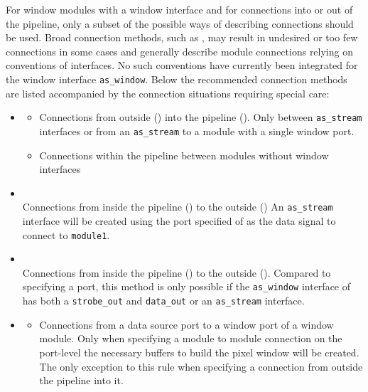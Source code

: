 For window modules with a window interface and for connections into or out of the pipeline, only a subset of the possible ways of describing connections should be used.
Broad connection methods, such as , may result in undesired or too few connections in some cases and generally describe module connections relying on conventions of interfaces.
No such conventions have currently been integrated for the window interface \texttt{as\_window}.
Below the recommended connection methods are listed accompanied by the connection situations requiring special care:
\begin{itemize}
\item {}
	\begin{itemize}
	\item Connections from outside () into the pipeline (). Only between \texttt{as\_stream} interfaces or from an \texttt{as\_stream} to a module with a single window port.	
	\item Connections within the pipeline between modules without window interfaces
	\end{itemize}
\item {}\\
	Connections from inside the pipeline () to the outside ()
	An \texttt{as\_stream} interface will be created using the port specified of  as the data signal to connect to \texttt{module1}.
\item {}\\
	Connections from inside the pipeline () to the outside ().
	Compared to specifying a port, this method is only possible if the \texttt{as\_window} interface of  has both a \texttt{strobe\_out} and \texttt{data\_out} or an \texttt{as\_stream} interface.
\item {}
	\begin{itemize}
	\item Connections from a data source port to a window port of a window module.
	Only when specifying a module to module connection on the port-level the necessary buffers to build the pixel window will be created.
	The only exception to this rule when specifying a connection from outside the pipeline into it.

\end{itemize}
\end{itemize}
